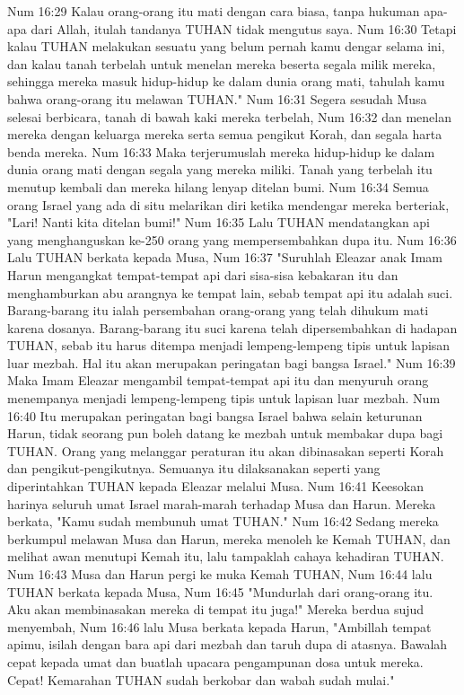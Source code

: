 Num 16:29  Kalau orang-orang itu mati dengan cara biasa, tanpa hukuman apa-apa dari Allah, itulah tandanya TUHAN tidak mengutus saya.
Num 16:30  Tetapi kalau TUHAN melakukan sesuatu yang belum pernah kamu dengar selama ini, dan kalau tanah terbelah untuk menelan mereka beserta segala milik mereka, sehingga mereka masuk hidup-hidup ke dalam dunia orang mati, tahulah kamu bahwa orang-orang itu melawan TUHAN."
Num 16:31  Segera sesudah Musa selesai berbicara, tanah di bawah kaki mereka terbelah,
Num 16:32  dan menelan mereka dengan keluarga mereka serta semua pengikut Korah, dan segala harta benda mereka.
Num 16:33  Maka terjerumuslah mereka hidup-hidup ke dalam dunia orang mati dengan segala yang mereka miliki. Tanah yang terbelah itu menutup kembali dan mereka hilang lenyap ditelan bumi.
Num 16:34  Semua orang Israel yang ada di situ melarikan diri ketika mendengar mereka berteriak, "Lari! Nanti kita ditelan bumi!"
Num 16:35  Lalu TUHAN mendatangkan api yang menghanguskan ke-250 orang yang mempersembahkan dupa itu.
Num 16:36  Lalu TUHAN berkata kepada Musa,
Num 16:37  "Suruhlah Eleazar anak Imam Harun mengangkat tempat-tempat api dari sisa-sisa kebakaran itu dan menghamburkan abu arangnya ke tempat lain, sebab tempat api itu adalah suci. Barang-barang itu ialah persembahan orang-orang yang telah dihukum mati karena dosanya. Barang-barang itu suci karena telah dipersembahkan di hadapan TUHAN, sebab itu harus ditempa menjadi lempeng-lempeng tipis untuk lapisan luar mezbah. Hal itu akan merupakan peringatan bagi bangsa Israel."
Num 16:39  Maka Imam Eleazar mengambil tempat-tempat api itu dan menyuruh orang menempanya menjadi lempeng-lempeng tipis untuk lapisan luar mezbah.
Num 16:40  Itu merupakan peringatan bagi bangsa Israel bahwa selain keturunan Harun, tidak seorang pun boleh datang ke mezbah untuk membakar dupa bagi TUHAN. Orang yang melanggar peraturan itu akan dibinasakan seperti Korah dan pengikut-pengikutnya. Semuanya itu dilaksanakan seperti yang diperintahkan TUHAN kepada Eleazar melalui Musa.
Num 16:41  Keesokan harinya seluruh umat Israel marah-marah terhadap Musa dan Harun. Mereka berkata, "Kamu sudah membunuh umat TUHAN."
Num 16:42  Sedang mereka berkumpul melawan Musa dan Harun, mereka menoleh ke Kemah TUHAN, dan melihat awan menutupi Kemah itu, lalu tampaklah cahaya kehadiran TUHAN.
Num 16:43  Musa dan Harun pergi ke muka Kemah TUHAN,
Num 16:44  lalu TUHAN berkata kepada Musa,
Num 16:45  "Mundurlah dari orang-orang itu. Aku akan membinasakan mereka di tempat itu juga!" Mereka berdua sujud menyembah,
Num 16:46  lalu Musa berkata kepada Harun, "Ambillah tempat apimu, isilah dengan bara api dari mezbah dan taruh dupa di atasnya. Bawalah cepat kepada umat dan buatlah upacara pengampunan dosa untuk mereka. Cepat! Kemarahan TUHAN sudah berkobar dan wabah sudah mulai."
